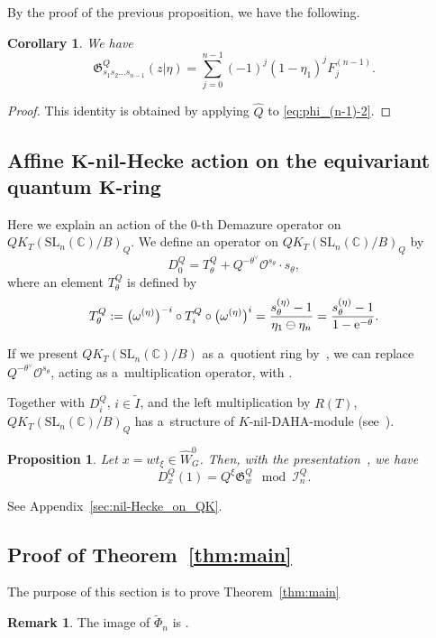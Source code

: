 \documentclass[10pt,a4paper]{amsart}
\numberwithin{equation}{section}
\newcommand{\C}{\mathbb{C}}
\newcommand{\Gro}[1]{\mathfrak{G}^Q_{#1}}
\newcommand{\Iaf}{\tilde{I}}
\newcommand{\Rep}{{R(T)}}
\newcommand{\SL}{\mathrm{SL}}
\newtheorem{Corollary}[Theorem]{Corollary}
\newtheorem{Proposition}[Theorem]{Proposition}
\theoremstyle{definition}
\newtheorem{Remark}[Theorem]{Remark}
\begin{document}
By the proof of the previous
proposition, we have the following.
\begin{Corollary}\label{cor:phi_(n-1)}
We have
\[
\Gro{s_1s_2\dots s_{n-1}}(z|\eta)=
\sum_{j=0}^{n-1}(-1)^j(1-\eta_{1})^{j}F_j^{(n-1)}.
\]
\end{Corollary}
\begin{proof} This identity is obtained by
applying $\hat{Q}$ to
\eqref{eq:phi_(n-1)-2}.
\end{proof}





\subsection[Affine K-nil-Hecke action on the equivariant quantum K-ring]{Affine $\boldsymbol{K}$-nil-Hecke action on the equivariant quantum $\boldsymbol{K}$-ring}
Here we explain an action of
the $0$-th Demazure operator on
$QK_T(\SL_n(\C)/B)_Q$.
We define an operator  on
$QK_T(\SL_n(\C)/B)_Q$ by
\begin{equation}
\label{eq:D0Q}
D_0^Q=T^{Q}_{\theta}+
Q^{-\theta^\vee}
\mathscr{O}^{s_\theta}\cdot
s_\theta,
\end{equation}
where an element $T^Q_\theta$ is defined by
\[
T^Q_\theta:=\bigl(\omega^{(\eta)}\bigr)^{-i}\circ T^Q_i\circ \bigl(\omega^{(\eta)}\bigr)^i=\frac{s_\theta^{(\eta)}-1}{\eta_1\ominus\eta_n}=\frac{s^{(\eta)}_\theta-1}{1-{\rm e}^{-\theta}}.
\]

If we present $QK_T(\SL_n(\C)/B)$ as a~quotient ring by~\cite{MNS1}, we can replace
$Q^{-\theta^\vee}\mathscr{O}^{s_\theta}$, acting as a~multiplication operator,
with \smash{$Q^{-\theta^\vee}\Gro{s_\theta}$}.

Together with $D_i^Q$, $i\in \Iaf$, and the left multiplication by $R(T)$,
 $QK_T(\SL_n(\C)/B)_Q$ has a~structure of $K$-nil-DAHA-module (see~\cite{KNS,KoNOS,Orr}).


\begin{Proposition}\label{prop:Quantum_D(1)}
Let $x=wt_\xi\in \hat{W}_G^0$. Then, with the presentation~{\rm\cite{MNS1}}, we have
\[%
D_x^Q(1)
=Q^\xi \Gro{w} \mod \mathscr{I}_n^Q.
\]
\end{Proposition}
See Appendix~\ref{sec:nil-Hecke_on_QK}.



\subsection{Proof of Theorem~\ref{thm:main}}
The purpose of this section is to prove Theorem~\ref{thm:main}
\begin{Remark}
The image of $\tilde{\Phi}_n$ is \smash{$\hat{\Lambda}_{(n)}^\Rep\big[\sigma_i^{-1},(\sigma(\sigma_i))^{-1}|1\leq i\leq n\big]$}.
\end{Remark}
\end{document}
